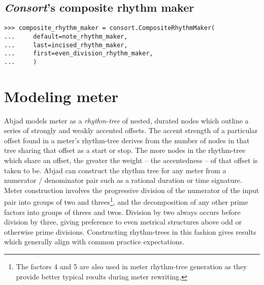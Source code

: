 \subsection{\emph{Consort}'s composite rhythm maker} %

\begin{comment}
<abjad>
composite_rhythm_maker = consort.CompositeRhythmMaker(
    default=note_rhythm_maker,
    last=incised_rhythm_maker,
    first=even_division_rhythm_maker,
    )
</abjad>
\end{comment}

\begin{singlespacing}
\vspace{-0.5\baselineskip}
\begin{lstlisting}
>>> composite_rhythm_maker = consort.CompositeRhythmMaker(
...     default=note_rhythm_maker,
...     last=incised_rhythm_maker,
...     first=even_division_rhythm_maker,
...     )
\end{lstlisting}
\end{singlespacing}

\section{Modeling meter}

Abjad models meter as a \emph{rhythm-tree} of nested, durated nodes which
outline a series of strongly and weakly accented offsets. The accent strength
of a particular offset found in a meter's rhythm-tree derives from the number
of nodes in that tree sharing that offset as a start or stop. The more nodes in
the rhythm-tree which share an offset, the greater the weight -- the
accentedness -- of that offset is taken to be. Abjad can construct the rhythm
tree for any meter from a numerator / denominator pair such as a rational
duration or time signature. Meter construction involves the progressive
division of the numerator of the input pair into groups of two and
threes\footnote{The factors 4 and 5 are also used in meter rhythm-tree
generation as they provide better typical results during meter rewriting.}, and
the decomposition of any other prime factors into groups of threes and twos.
Division by two always occurs before division by three, giving preference to
even metrical structures above odd or otherwise prime divisions. Constructing
rhythm-trees in this fashion gives results which generally align with common
practice expectations.

